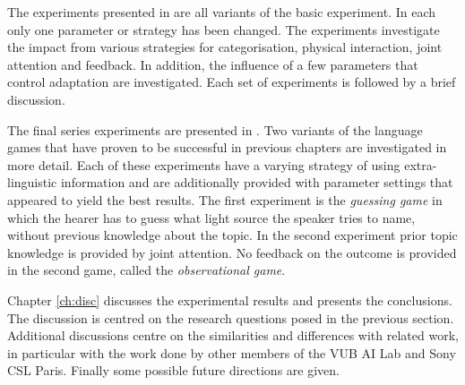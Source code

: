 The experiments presented in  are all variants of the basic experiment. In each only one parameter or strategy has been changed. The experiments investigate the impact from various strategies for categorisation, physical interaction, joint attention and feedback. In addition, the influence of a few parameters that control adaptation are investigated. Each set of experiments is followed by a brief discussion.

The final series experiments are presented in . Two variants of the language games that have proven to be successful in previous chapters are investigated in more detail. Each of these experiments have a varying strategy of using extra-linguistic information and are additionally provided with parameter settings that appeared to yield the best results. The first experiment is the {\em guessing game} in which the hearer has to guess what light source the speaker tries to name, without previous knowledge about the topic. In the second experiment prior topic knowledge is provided by joint attention. No feedback on the outcome is provided in the second game, called the {\em observational game}.


Chapter \ref{ch:disc} discusses the experimental results and presents the conclusions. The discussion is centred on the research questions posed in the previous section. Additional discussions centre on the similarities and differences with related work, in particular with the work done by other members of the VUB AI Lab and Sony CSL Paris. Finally some possible future directions are given.





